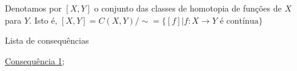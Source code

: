 Denotamos por $[X,Y]$ o conjunto das classes de homotopia de funções de $X$ para $Y$. Isto é, $[X,Y]=C(X,Y)/\sim=\{[f]|f:X\rightarrow Y\text{ é contínua}\}$ 

\begin{titlemize}{Lista de consequências}
	\item \hyperref[consequencia1]{Consequência 1};\\ %
	\item \hyperref[]{}
\end{titlemize}


